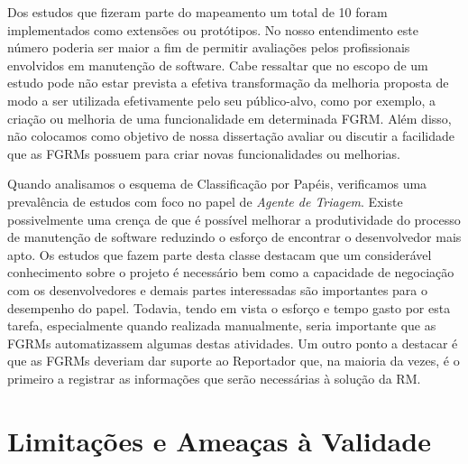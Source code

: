 Dos estudos que fizeram parte do mapeamento um total de 10 foram implementados
como extensões ou protótipos. No nosso entendimento este número poderia ser
maior a fim de permitir avaliações pelos profissionais envolvidos em manutenção
de software. Cabe ressaltar que no escopo de um estudo pode não estar prevista a
efetiva transformação da melhoria proposta de modo a ser utilizada efetivamente
pelo seu público-alvo, como por exemplo, a criação ou melhoria de uma
funcionalidade em determinada FGRM\@. Além disso, não colocamos como objetivo de
nossa dissertação avaliar ou discutir a facilidade que as FGRMs possuem para
criar novas funcionalidades ou melhorias.


Quando analisamos o esquema de Classificação por Papéis, verificamos uma
prevalência de estudos com foco no papel de \textit{Agente de Triagem}. Existe
possivelmente uma crença de que é possível melhorar a produtividade do processo
de manutenção de software reduzindo o esforço de encontrar o desenvolvedor mais
apto. Os estudos que fazem parte desta classe destacam que um considerável
conhecimento sobre o projeto é necessário bem como a capacidade de negociação
com os desenvolvedores e demais partes interessadas são importantes para o
desempenho do papel. Todavia, tendo em vista o esforço e tempo gasto por esta
tarefa, especialmente quando realizada ma\-nu\-al\-men\-te, seria importante que
as FGRMs automatizassem algumas destas atividades. Um outro ponto a destacar é
que as FGRMs deveriam dar suporte ao Reportador que, na maioria da vezes, é o
primeiro a registrar as informações que serão necessárias à solução da RM\@.

\section{Limitações e Ameaças à Validade}
\label{sec:map_limitacoes_ameacas}

